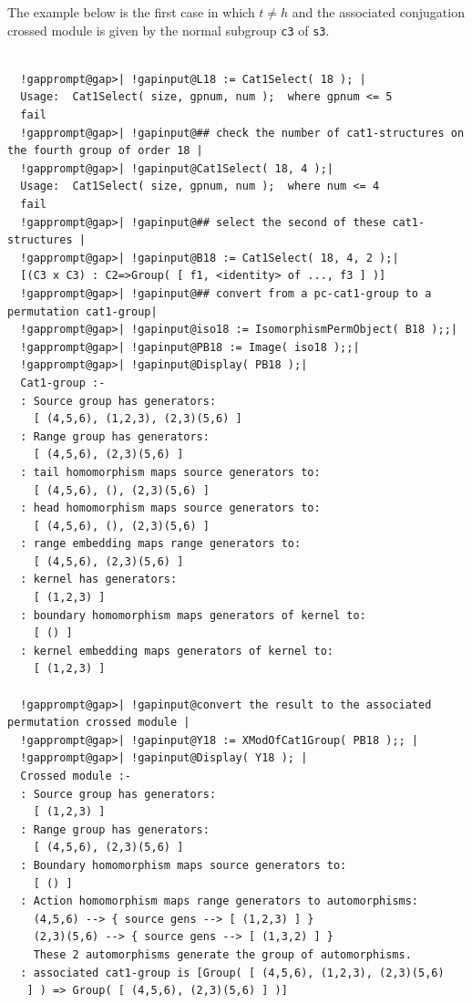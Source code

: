 \documentclass[a4paper,11pt]{report}
\begin{document}
{{{ 

 The example below is the first case in which $t \neq h$ and the associated conjugation crossed module is given by the normal subgroup \texttt{c3} of \texttt{s3}. }

 

 
\begin{Verbatim}[commandchars=!@|,fontsize=\small,frame=single,label=Example]
  
  !gapprompt@gap>| !gapinput@L18 := Cat1Select( 18 ); |
  Usage:  Cat1Select( size, gpnum, num );  where gpnum <= 5
  fail
  !gapprompt@gap>| !gapinput@## check the number of cat1-structures on the fourth group of order 18 |
  !gapprompt@gap>| !gapinput@Cat1Select( 18, 4 );|
  Usage:  Cat1Select( size, gpnum, num );  where num <= 4
  fail
  !gapprompt@gap>| !gapinput@## select the second of these cat1-structures |
  !gapprompt@gap>| !gapinput@B18 := Cat1Select( 18, 4, 2 );|
  [(C3 x C3) : C2=>Group( [ f1, <identity> of ..., f3 ] )]
  !gapprompt@gap>| !gapinput@## convert from a pc-cat1-group to a permutation cat1-group|
  !gapprompt@gap>| !gapinput@iso18 := IsomorphismPermObject( B18 );;|
  !gapprompt@gap>| !gapinput@PB18 := Image( iso18 );;|
  !gapprompt@gap>| !gapinput@Display( PB18 );|
  Cat1-group :- 
  : Source group has generators:
    [ (4,5,6), (1,2,3), (2,3)(5,6) ]
  : Range group has generators:
    [ (4,5,6), (2,3)(5,6) ]
  : tail homomorphism maps source generators to:
    [ (4,5,6), (), (2,3)(5,6) ]
  : head homomorphism maps source generators to:
    [ (4,5,6), (), (2,3)(5,6) ]
  : range embedding maps range generators to:
    [ (4,5,6), (2,3)(5,6) ]
  : kernel has generators:
    [ (1,2,3) ]
  : boundary homomorphism maps generators of kernel to:
    [ () ]
  : kernel embedding maps generators of kernel to:
    [ (1,2,3) ]
  
  !gapprompt@gap>| !gapinput@convert the result to the associated permutation crossed module |
  !gapprompt@gap>| !gapinput@Y18 := XModOfCat1Group( PB18 );; |
  !gapprompt@gap>| !gapinput@Display( Y18 ); |
  Crossed module :- 
  : Source group has generators:
    [ (1,2,3) ]
  : Range group has generators:
    [ (4,5,6), (2,3)(5,6) ]
  : Boundary homomorphism maps source generators to:
    [ () ]
  : Action homomorphism maps range generators to automorphisms:
    (4,5,6) --> { source gens --> [ (1,2,3) ] }
    (2,3)(5,6) --> { source gens --> [ (1,3,2) ] }
    These 2 automorphisms generate the group of automorphisms.
  : associated cat1-group is [Group( [ (4,5,6), (1,2,3), (2,3)(5,6) 
   ] ) => Group( [ (4,5,6), (2,3)(5,6) ] )]
  

\end{Verbatim}}}
\end{document}
